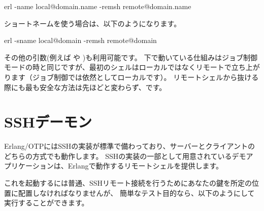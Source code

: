\begin{VerbatimText}
erl -name local@domain.name -remsh remote@domain.name
\end{VerbatimText}

ショートネームを使う場合は、以下のようになります。

\begin{VerbatimText}
erl -sname local@domain -remsh remote@domain
\end{VerbatimText}

その他の引数(例えば  や )も利用可能です。
下で動いている仕組みはジョブ制御モードの時と同じですが、最初のシェルはローカルではなくリモートで立ち上がります（ジョブ制御では依然としてローカルです）。
リモートシェルから抜ける際にも最も安全な方法は先ほどと変わらず、です。

\section{SSHデーモン}

Erlang/OTPにはSSHの実装が標準で備わっており、サーバーとクライアントのどちらの方式でも動作します。
SSHの実装の一部として用意されているデモアプリケーションは、Erlangで動作するリモートシェルを提供します。

これを起動するには普通、SSHリモート接続を行うためにあなたの鍵を所定の位置に配置しなければなりませんが、
簡単なテスト目的なら、以下のようにして実行することができます。


